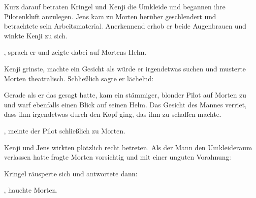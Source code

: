 \par

Kurz darauf betraten Kringel und Kenji die Umkleide und begannen ihre Pilotenkluft anzulegen. Jens kam zu Morten herüber geschlendert und betrachtete sein Arbeitsmaterial. Anerkennend erhob er beide Augenbrauen und winkte Kenji zu sich.

\par

, sprach er und zeigte dabei auf Mortens Helm. 

\par

Kenji grinste, machte ein Gesicht als würde er irgendetwas suchen und musterte Morten theatralisch. Schließlich sagte er lächelnd: 

\par

Gerade als er das gesagt hatte, kam ein stämmiger, blonder Pilot auf Morten zu und warf ebenfalls einen Blick auf seinen Helm. Das Gesicht des Mannes verriet, dass ihm irgendetwas durch den Kopf ging, das ihm zu schaffen machte.

\par

, meinte der Pilot schließlich zu Morten. 

\par

Kenji und Jens wirkten plötzlich recht betreten. Als der Mann den Umkleideraum verlassen hatte fragte Morten vorsichtig und mit einer unguten Vorahnung: 

\par

Kringel räusperte sich und antwortete dann: 

\par

, hauchte Morten. 

\par


